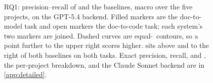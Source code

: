 \begin{figure}[t]
{}
\caption{RQ1: precision--recall of \approach{} and the baselines, macro over the five projects, on the GPT-5.4 backend. Filled markers are the doc-to-model task and open markers the doc-to-code task; each system's two markers are joined. Dashed curves are equal-\fone\ contours, so a point further to the upper right scores higher. \approach{} sits above and to the right of both baselines on both tasks. Exact precision, recall, and \fone, the per-project breakdown, and the Claude Sonnet backend are in \autoref{app:detailed}.}
\ifdefined\rqoneLabelDone\else
  \label{fig:rq1-scatter}\global\let\rqoneLabelDone\relax
\fi
\end{figure}
